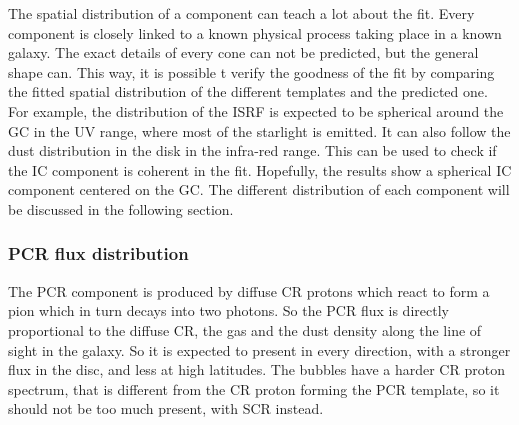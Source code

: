 The spatial distribution of a component can teach a lot about the fit. Every component is closely linked to a known physical process taking place in a known galaxy. The exact details of every cone can not be predicted, but the general shape can. This way, it is possible t verify the goodness of the fit by comparing the fitted spatial distribution of the different templates and the predicted one.
For example, the distribution of the ISRF is expected to be spherical around the GC in the UV range, where most of the starlight is emitted. It can also follow the dust distribution in the disk in the infra-red range. This can be used to check if the IC component is coherent in the fit. Hopefully, the results show a spherical IC component centered on the GC.
The different distribution of each component will be discussed in the following section.

\subsubsection{PCR flux distribution}
The PCR component is produced by diffuse CR protons which react to form a pion which in turn decays into two photons. So the PCR flux is directly proportional to the diffuse CR, the gas and the dust density along the line of sight in the galaxy. So it is expected to present in every direction, with a stronger flux in the disc, and less at high latitudes. The bubbles have a harder CR proton spectrum, that is different from the CR proton forming the PCR template, so it should not be too much present, with SCR instead.

